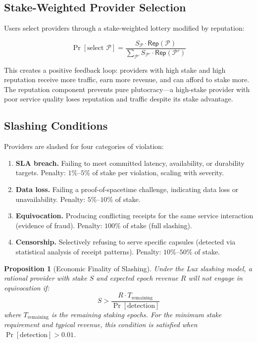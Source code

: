 \documentclass[11pt,a4paper]{article}
\newtheorem{proposition}[theorem]{Proposition}
\begin{document}
\subsection{Stake-Weighted Provider Selection}

Users select providers through a stake-weighted lottery modified by reputation:

\begin{equation}\label{eq:selection}
    \Pr[\text{select } \mathcal{P}] = \frac{S_{\mathcal{P}} \cdot \mathsf{Rep}(\mathcal{P})}{\sum_{\mathcal{P}'} S_{\mathcal{P}'} \cdot \mathsf{Rep}(\mathcal{P}')}
\end{equation}

This creates a positive feedback loop: providers with high stake and high
reputation receive more traffic, earn more revenue, and can afford to stake
more. The reputation component prevents pure plutocracy---a high-stake
provider with poor service quality loses reputation and traffic despite
its stake advantage.

\subsection{Slashing Conditions}

Providers are slashed for four categories of violation:

\begin{enumerate}
    \item \textbf{SLA breach.} Failing to meet committed latency, availability,
    or durability targets. Penalty: $1\%$--$5\%$ of stake per violation,
    scaling with severity.

    \item \textbf{Data loss.} Failing a proof-of-spacetime challenge, indicating
    data loss or unavailability. Penalty: $5\%$--$10\%$ of stake.

    \item \textbf{Equivocation.} Producing conflicting receipts for the same
    service interaction (evidence of fraud). Penalty: $100\%$ of stake
    (full slashing).

    \item \textbf{Censorship.} Selectively refusing to serve specific capsules
    (detected via statistical analysis of receipt patterns). Penalty:
    $10\%$--$50\%$ of stake.
\end{enumerate}

\begin{proposition}[Economic Finality of Slashing]
Under the Lux slashing model, a rational provider with stake $S$ and
expected epoch revenue $R$ will not engage in equivocation if:
\begin{equation}
    S > \frac{R \cdot T_{\text{remaining}}}{\Pr[\text{detection}]}
\end{equation}
where $T_{\text{remaining}}$ is the remaining staking epochs. For the
minimum stake requirement and typical revenue, this condition is satisfied
when $\Pr[\text{detection}] > 0.01$.
\end{proposition}
\end{document}
